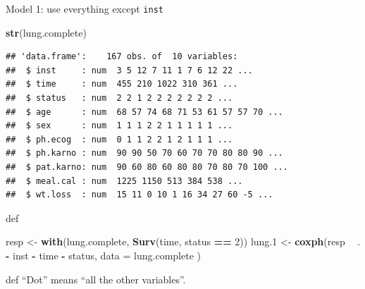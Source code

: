 \documentclass[ignorenonframetext,]{beamer}
\newenvironment{Shaded}{\begin{snugshade}}{\end{snugshade}}
\newcommand{\DataTypeTok}[1]{\textcolor[rgb]{0.13,0.29,0.53}{#1}}
\newcommand{\DecValTok}[1]{\textcolor[rgb]{0.00,0.00,0.81}{#1}}
\newcommand{\FloatTok}[1]{\textcolor[rgb]{0.00,0.00,0.81}{#1}}
\newcommand{\KeywordTok}[1]{\textcolor[rgb]{0.13,0.29,0.53}{\textbf{#1}}}
\newcommand{\NormalTok}[1]{#1}
\newcommand{\OperatorTok}[1]{\textcolor[rgb]{0.81,0.36,0.00}{\textbf{#1}}}
\newcommand{\StringTok}[1]{\textcolor[rgb]{0.31,0.60,0.02}{#1}}
\begin{document}
\begin{frame}[fragile]{Model 1: use everything except \texttt{inst}}
\protect\hypertarget{model-1-use-everything-except-inst}{}

\begin{Shaded}
\begin{Highlighting}[]
\KeywordTok{str}\NormalTok{(lung.complete)}
\end{Highlighting}
\end{Shaded}

\begin{verbatim}
## 'data.frame':    167 obs. of  10 variables:
##  $ inst     : num  3 5 12 7 11 1 7 6 12 22 ...
##  $ time     : num  455 210 1022 310 361 ...
##  $ status   : num  2 2 1 2 2 2 2 2 2 2 ...
##  $ age      : num  68 57 74 68 71 53 61 57 57 70 ...
##  $ sex      : num  1 1 1 2 2 1 1 1 1 1 ...
##  $ ph.ecog  : num  0 1 1 2 2 1 2 1 1 1 ...
##  $ ph.karno : num  90 90 50 70 60 70 70 80 80 90 ...
##  $ pat.karno: num  90 60 80 60 80 80 70 80 70 100 ...
##  $ meal.cal : num  1225 1150 513 384 538 ...
##  $ wt.loss  : num  15 11 0 10 1 16 34 27 60 -5 ...
\end{verbatim}

def

\begin{Shaded}
\begin{Highlighting}[]
\NormalTok{resp <-}\StringTok{ }\KeywordTok{with}\NormalTok{(lung.complete, }\KeywordTok{Surv}\NormalTok{(time, status }\OperatorTok{==}\StringTok{ }\DecValTok{2}\NormalTok{))}
\NormalTok{lung}\FloatTok{.1}\NormalTok{ <-}\StringTok{ }\KeywordTok{coxph}\NormalTok{(resp }\OperatorTok{~}\StringTok{ }\NormalTok{. }\OperatorTok{-}\StringTok{ }\NormalTok{inst }\OperatorTok{-}\StringTok{ }\NormalTok{time }\OperatorTok{-}\StringTok{ }\NormalTok{status,}
  \DataTypeTok{data =}\NormalTok{ lung.complete}
\NormalTok{)}
\end{Highlighting}
\end{Shaded}

def ``Dot'' means ``all the other variables''.

\end{frame}
\end{document}
